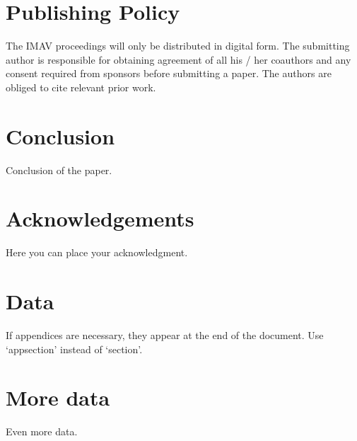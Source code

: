 \documentclass[letterpaper]{article}
\begin{document}
\section{Publishing Policy}
The IMAV proceedings will only be distributed in digital form. The submitting author is responsible for obtaining agreement of all his / her coauthors and any consent required from sponsors before submitting a paper. The authors are obliged to cite relevant prior work.

\section{Conclusion}
Conclusion of the paper.

\section*{Acknowledgements}
Here you can place your acknowledgment.




\appendix
\newcommand{\appsection}[1]{\let\oldthesection\thesection
  \renewcommand{\thesection}{Appendix \oldthesection:}
  \section{#1}\let\thesection\oldthesection}

\appsection{Data}
If appendices are necessary, they appear at the end of the document. Use `appsection' instead of `section'.
\appsection{More data}
Even more data.
\end{document}
